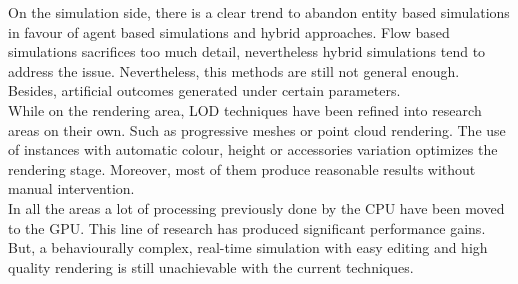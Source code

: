 \documentclass[6pt]{article} %
\begin{document}
\begin{multicols}{2}
On the simulation side, there is a clear trend to abandon entity based simulations in favour of agent based simulations and hybrid approaches.
Flow based simulations sacrifices too much detail, nevertheless hybrid simulations tend to address the issue.
Nevertheless, this methods are still not general enough.
Besides, artificial outcomes generated under certain parameters.\\

While on the rendering area, LOD techniques have been refined into research areas on their own.
Such as progressive meshes or point cloud rendering.
The use of instances with automatic colour, height or accessories variation optimizes the rendering stage.
Moreover, most of them produce reasonable results without manual intervention.\\

In all the areas a lot of processing previously done by the CPU have been moved to the GPU.
This line of research has produced significant performance gains.
But, a behaviourally complex, real-time simulation with easy editing and high quality rendering is still unachievable with the current techniques.

\end{multicols}
\end{document}
